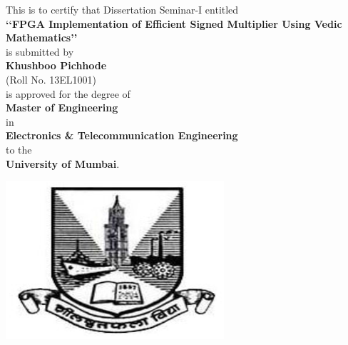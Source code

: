 \begin{center}
\large This is to certify that Dissertation Seminar-I entitled
\vspace{0.15in}\\\textbf {\lq\lq FPGA Implementation of Efficient Signed Multiplier Using Vedic Mathematics\rq\rq} \\
\vspace{0.1in}is submitted by\vspace{0.15in}
\\\textbf {Khushboo Pichhode} \\
(Roll No. 13EL1001)\\\vspace{0.1in} is approved for the degree of \vspace{0.15in} \\\textbf{Master of Engineering}\\
in \\\textbf{Electronics \& Telecommunication Engineering} \\to the \\\textbf{University
of Mumbai}.


\includegraphics{university.eps}

 \vspace{0.2in}
%
%
%
\begin{tabular}{ccc}


\end{tabular}
\end{center}
